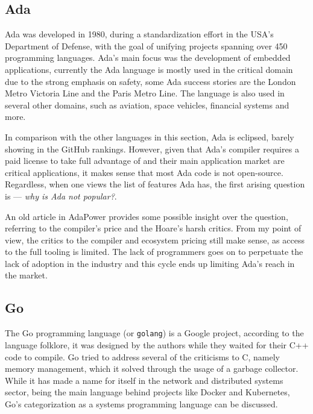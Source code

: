 \subsection{Ada}

Ada was developed in 1980, during a standardization effort in the USA's Department of Defense,
with the goal of unifying projects spanning over 450 programming languages.
Ada's main focus was the development of embedded applications,
currently the Ada language is mostly used in the critical domain due to the strong emphasis on safety,
some Ada success stories are the London Metro Victoria Line and the Paris Metro Line.
The language is also used in several other domains, such as aviation, space vehicles, financial systems and more.

In comparison with the other languages in this section, Ada is eclipsed, barely showing in the GitHub rankings.
However, given that Ada's compiler requires a paid license to take full advantage of and their main application market are critical applications,
it makes sense that most Ada code is not open-source.
Regardless, when one views the list of features Ada has, the first arising question is --- \emph{why is Ada not popular?}.

An old article in AdaPower provides some possible insight over the question,
referring to the compiler's price and the Hoare's harsh critics.
From my point of view, the critics to the compiler and ecosystem pricing still make sense,
as access to the full tooling is limited.
The lack of programmers goes on to perpetuate the lack of adoption in the industry
and this cycle ends up limiting Ada's reach in the market.

\subsection{Go}

The Go programming language (or \texttt{golang}) is a Google project,
according to the language folklore, it was designed by the authors while they waited for their C++ code to compile.
Go tried to address several of the criticisms to C, namely memory management, which it solved through the usage of a garbage collector.
While it has made a name for itself in the network and distributed systems sector,
being the main language behind projects like Docker and Kubernetes,
Go's categorization as a systems programming language can be discussed.

